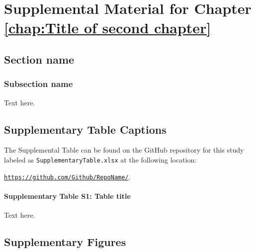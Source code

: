\appendix{}

\chapter{Supplemental Material for Chapter \ref{chap:Title of second chapter}}

\section{Section name}

\subsection{Subsection name}
Text here.

\section{Supplementary Table Captions}

The Supplemental Table can be found on the GitHub repository for this study labeled as \verb|SupplementaryTable.xlsx| at the following location: 

\noindent \href{https://github.com/Github/RepoName/}{\texttt{https://github.com/Github/RepoName/}}.

\par\noindent\dotfill

\subsubsection{Supplementary Table S1: Table title}
Text here.

\section{Supplementary Figures}

